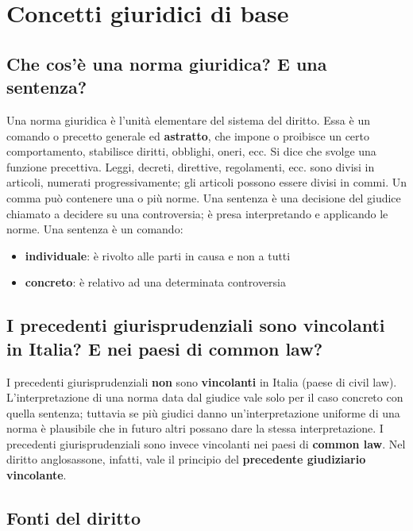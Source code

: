 \newpage
\section{Concetti giuridici di base}

\subsection{Che cos'è una norma giuridica? E una sentenza?}
Una norma giuridica è l'unità elementare del sistema del diritto.
Essa è un comando o precetto generale ed \textbf{astratto}, che impone o proibisce
un certo comportamento, stabilisce diritti, obblighi, oneri, ecc. Si dice che
svolge una funzione precettiva. \newline
Leggi, decreti, direttive, regolamenti, ecc. sono divisi in articoli, numerati
progressivamente; gli articoli possono essere divisi in commi. \newline
Un comma può contenere una o più norme. \newline
Una sentenza è una decisione del giudice chiamato a decidere su una controversia;
è presa interpretando e applicando le norme. \newline
Una sentenza è un comando:
\begin{itemize}
    \item \textbf{individuale}: è rivolto alle parti in causa e non a tutti
    \item \textbf{concreto}: è relativo ad una determinata controversia
\end{itemize}

\subsection{I precedenti giurisprudenziali sono vincolanti in Italia? E nei paesi di common law?}
I precedenti giurisprudenziali \textbf{non} sono \textbf{vincolanti} in Italia (paese di civil law).
L'interpretazione di una norma data dal giudice vale solo per il caso concreto
con quella sentenza; tuttavia se più giudici danno un'interpretazione uniforme
di una norma è plausibile che in futuro altri possano dare la stessa interpretazione.
\newline
\newline
I precedenti giurisprudenziali sono invece vincolanti nei paesi di \textbf{common law}.
Nel diritto anglosassone, infatti, vale il principio del \textbf{precedente giudiziario vincolante}.

\subsection{Fonti del diritto}


